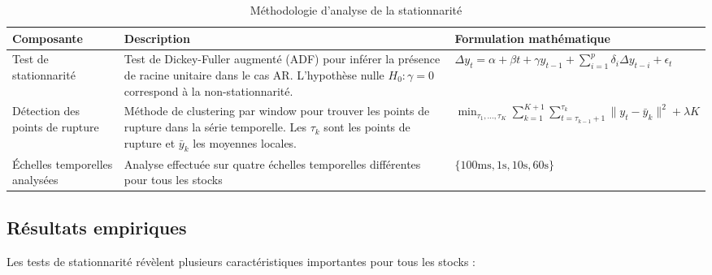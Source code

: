 \documentclass[10pt,a4paper]{article}
\theoremstyle{definition}
\theoremstyle{remark}
\begin{document}
\begin{landscape}
\begin{table}[h!]
\centering
\begin{tabular}{|p{4cm}|p{8cm}|p{8cm}|}
\hline
\textbf{Composante} & \textbf{Description} & \textbf{Formulation mathématique} \\
\hline
Test de stationnarité & Test de Dickey-Fuller augmenté (ADF) pour inférer la présence de racine unitaire dans le cas AR. L'hypothèse nulle $H_0: \gamma = 0$ correspond à la non-stationnarité. & $\Delta y_t = \alpha + \beta t + \gamma y_{t-1} + \sum_{i=1}^p \delta_i \Delta y_{t-i} + \epsilon_t$ \\
\hline
Détection des points de rupture & Méthode de clustering par window pour trouver les points de rupture dans la série temporelle. Les $\tau_k$ sont les points de rupture et $\bar{y}_k$ les moyennes locales. & $\min_{\tau_1,\ldots,\tau_K} \sum_{k=1}^{K+1} \sum_{t=\tau_{k-1}+1}^{\tau_k} \|y_t - \bar{y}_k\|^2 + \lambda K$ \\
\hline
Échelles temporelles analysées & Analyse effectuée sur quatre échelles temporelles différentes pour tous les stocks & $\{\text{100ms}, \text{1s}, \text{10s}, \text{60s}\}$ \\
\hline
\end{tabular}
\caption{Méthodologie d'analyse de la stationnarité}
\label{tab:stationarity_methodology}
\end{table}
\end{landscape}

\subsection{Résultats empiriques}

Les tests de stationnarité révèlent plusieurs caractéristiques importantes pour tous les stocks :
\end{document}
